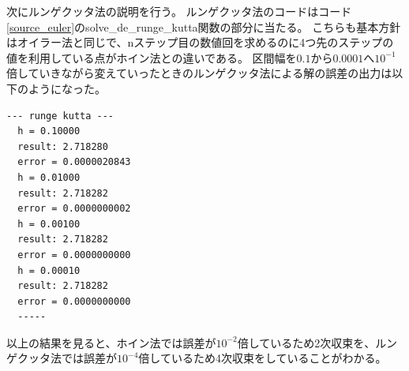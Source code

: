 \documentclass[a4paper]{jsarticle}
\begin{document}
次にルンゲクッタ法の説明を行う。
ルンゲクッタ法のコードはコード\ref{source_euler}のsolve\_de\_runge\_kutta関数の部分に当たる。
こちらも基本方針はオイラー法と同じで、nステップ目の数値回を求めるのに4つ先のステップの値を利用している点がホイン法との違いである。
区間幅を\(0.1\)から\(0.0001\)へ\(10^{-1}\)倍していきながら変えていったときのルンゲクッタ法による解の誤差の出力は以下のようになった。

\begin{lstlisting}[caption={\texttt{ルンゲクッタ法の誤差の出力}}]
  --- runge kutta ---
  h = 0.10000
  result: 2.718280
  error = 0.0000020843
  h = 0.01000
  result: 2.718282
  error = 0.0000000002
  h = 0.00100
  result: 2.718282
  error = 0.0000000000
  h = 0.00010
  result: 2.718282
  error = 0.0000000000
  -----
\end{lstlisting}

以上の結果を見ると、ホイン法では誤差が\(10^{-2}\)倍しているため2次収束を、ルンゲクッタ法では誤差が\(10^{-4}\)倍しているため4次収束をしていることがわかる。
\end{document}
